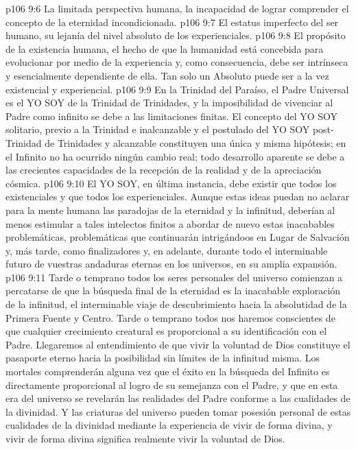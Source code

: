 \vs p106 9:6 La limitada perspectiva humana, la incapacidad de lograr comprender el concepto de la eternidad incondicionada.
\vs p106 9:7 El estatus imperfecto del ser humano, su lejanía del nivel absoluto de los experienciales.
\vs p106 9:8 El propósito de la existencia humana, el hecho de que la humanidad está concebida para evolucionar por medio de la experiencia y, como consecuencia, debe ser intrínseca y esencialmente dependiente de ella. Tan solo un Absoluto puede ser a la vez existencial y experiencial.
\vs p106 9:9 \pc En la Trinidad del Paraíso, el Padre Universal es el YO SOY de la Trinidad de Trinidades, y la imposibilidad de vivenciar al Padre como infinito se debe a las limitaciones finitas. El concepto del YO SOY  solitario, previo a la Trinidad e inalcanzable y el postulado del YO SOY  post\hyp{}Trinidad de Trinidades y alcanzable constituyen una única y misma hipótesis; en el Infinito no ha ocurrido ningún cambio real; todo desarrollo aparente se debe a las crecientes capacidades de la recepción de la realidad y de la apreciación cósmica.
\vs p106 9:10 El YO SOY, en última instancia, debe existir  que todos los existenciales y  que todos los experienciales. Aunque estas ideas puedan no aclarar para la mente humana las paradojas de la eternidad y la infinitud, deberían al menos estimular a tales intelectos finitos a abordar de nuevo estas inacabables problemáticas, problemáticas que continuarán intrigándoos en Lugar de Salvación y, más tarde, como finalizadores y, en adelante, durante todo el interminable futuro de vuestras andaduras eternas en los universos, en su amplia expansión.
\vs p106 9:11 \pc Tarde o temprano todos los seres personales del universo comienzan a percatarse de que la búsqueda final de la eternidad es la inacabable exploración de la infinitud, el interminable viaje de descubrimiento hacia la absolutidad de la Primera Fuente y Centro. Tarde o temprano todos nos haremos conscientes de que cualquier crecimiento creatural es proporcional a su identificación con el Padre. Llegaremos al entendimiento de que vivir la voluntad de Dios constituye el pasaporte eterno hacia la posibilidad sin límites de la infinitud misma. Los mortales comprenderán alguna vez que el éxito en la búsqueda del Infinito es directamente proporcional al logro de su semejanza con el Padre, y que en esta era del universo se revelarán las realidades del Padre conforme a las cualidades de la divinidad. Y las criaturas del universo pueden tomar posesión personal de estas cualidades de la divinidad mediante la experiencia de vivir de forma divina, y vivir de forma divina significa realmente vivir la voluntad de Dios.
